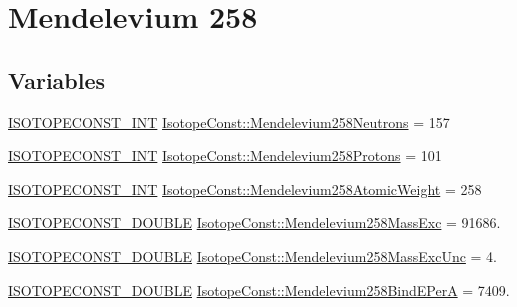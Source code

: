 \hypertarget{group___isotope_const-_mendelevium-_md258}{}\section{Mendelevium 258}
\label{group___isotope_const-_mendelevium-_md258}
\subsection*{Variables}
\begin{DoxyCompactItemize}
\item 
\mbox{\hyperlink{group___isotope_const-_macros_ga5f18360b3e99483a35c32d789e62621c}{I\+S\+O\+T\+O\+P\+E\+C\+O\+N\+S\+T\+\_\+\+I\+NT}} \mbox{\hyperlink{group___isotope_const-_mendelevium-_md258_gadb660aae15862812a437a35297cd8210}{Isotope\+Const\+::\+Mendelevium258\+Neutrons}} = 157
\item 
\mbox{\hyperlink{group___isotope_const-_macros_ga5f18360b3e99483a35c32d789e62621c}{I\+S\+O\+T\+O\+P\+E\+C\+O\+N\+S\+T\+\_\+\+I\+NT}} \mbox{\hyperlink{group___isotope_const-_mendelevium-_md258_ga46f456a023bdae59ea30908c3a034302}{Isotope\+Const\+::\+Mendelevium258\+Protons}} = 101
\item 
\mbox{\hyperlink{group___isotope_const-_macros_ga5f18360b3e99483a35c32d789e62621c}{I\+S\+O\+T\+O\+P\+E\+C\+O\+N\+S\+T\+\_\+\+I\+NT}} \mbox{\hyperlink{group___isotope_const-_mendelevium-_md258_ga755f40e58edf7160994e2d4d031517df}{Isotope\+Const\+::\+Mendelevium258\+Atomic\+Weight}} = 258
\item 
\mbox{\hyperlink{group___isotope_const-_macros_ga8f45a7272ce02c0b4c65c44636ed719a}{I\+S\+O\+T\+O\+P\+E\+C\+O\+N\+S\+T\+\_\+\+D\+O\+U\+B\+LE}} \mbox{\hyperlink{group___isotope_const-_mendelevium-_md258_ga3d5959d3ce3120ada207ac061bf05345}{Isotope\+Const\+::\+Mendelevium258\+Mass\+Exc}} = 91686.
\item 
\mbox{\hyperlink{group___isotope_const-_macros_ga8f45a7272ce02c0b4c65c44636ed719a}{I\+S\+O\+T\+O\+P\+E\+C\+O\+N\+S\+T\+\_\+\+D\+O\+U\+B\+LE}} \mbox{\hyperlink{group___isotope_const-_mendelevium-_md258_ga4b67fa20a17feae10a77136f05ef73a9}{Isotope\+Const\+::\+Mendelevium258\+Mass\+Exc\+Unc}} = 4.
\item 
\mbox{\hyperlink{group___isotope_const-_macros_ga8f45a7272ce02c0b4c65c44636ed719a}{I\+S\+O\+T\+O\+P\+E\+C\+O\+N\+S\+T\+\_\+\+D\+O\+U\+B\+LE}} \mbox{\hyperlink{group___isotope_const-_mendelevium-_md258_gaa7dfa7fd5c16bb67cf95aa6c677b5717}{Isotope\+Const\+::\+Mendelevium258\+Bind\+E\+PerA}} = 7409.

\end{DoxyCompactItemize}

